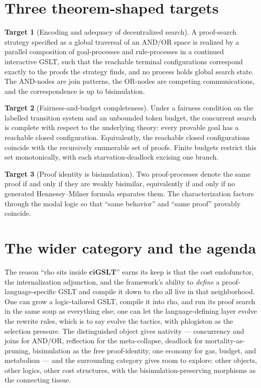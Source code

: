 \documentclass[11pt]{article}
\theoremstyle{plain}
\theoremstyle{definition}
\newtheorem{target}{Target}
\theoremstyle{remark}
\newcommand{\ciGSLT}{\mathbf{ciGSLT}}
\begin{document}
\section{Three theorem-shaped targets}

\begin{target}[Encoding and adequacy of decentralized search]
A proof-search strategy specified as a global traversal of an AND/OR space is
realized by a parallel composition of goal-processes and rule-processes in a
continued interactive GSLT, such that the reachable terminal configurations
correspond exactly to the proofs the strategy finds, and no process holds global
search state. The AND-nodes are join patterns, the OR-nodes are competing
communications, and the correspondence is up to bisimulation.
\end{target}

\begin{target}[Fairness-and-budget completeness]
Under a fairness condition on the labelled transition system and an unbounded
token budget, the concurrent search is complete with respect to the underlying
theory: every provable goal has a reachable closed configuration. Equivalently,
the reachable closed configurations coincide with the recursively enumerable set
of proofs. Finite budgets restrict this set monotonically, with each
starvation-deadlock excising one branch.
\end{target}

\begin{target}[Proof identity is bisimulation]
Two proof-processes denote the same proof if and only if they are
weakly bisimilar, equivalently if and only if no generated Hennessy--Milner
formula separates them. The characterization factors through the
modal logic so that ``same behavior'' and ``same proof'' provably coincide.
\end{target}

\section{The wider category and the agenda}

The reason ``rho sits inside $\ciGSLT$'' earns its keep is that the
cost endofunctor, the internalization adjunction, and the framework's ability to
\emph{define} a proof-language-specific GSLT and compile it down to rho all live
in that neighborhood. One can grow a logic-tailored GSLT, compile it into rho,
and run its proof search in the same soup as everything else; one can let the
language-defining layer evolve the rewrite rules, which is to say evolve the
tactics, with phlogiston as the selection pressure. The distinguished object
gives nativity --- concurrency and joins for AND/OR, reflection for the
meta-collapse, deadlock for mortality-as-pruning, bisimulation as the free
proof-identity, one economy for gas, budget, and metabolism --- and the
surrounding category gives room to explore: other objects, other logics, other
cost structures, with the bisimulation-preserving morphisms as the connecting
tissue.
\end{document}
